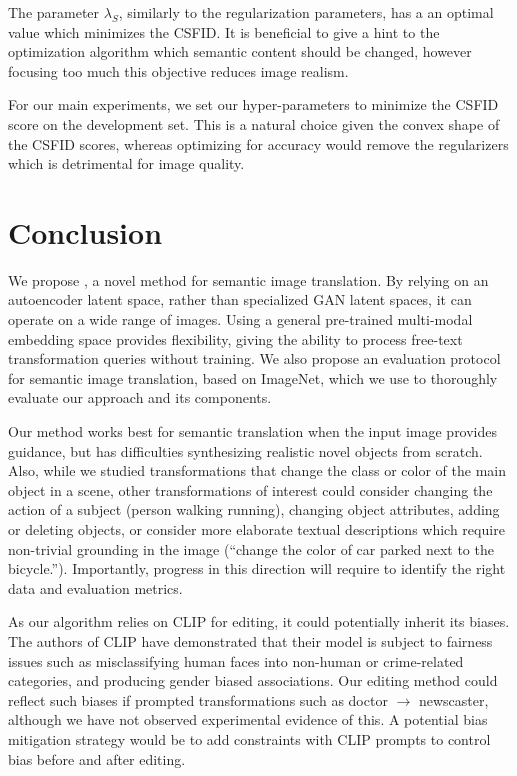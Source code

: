 The parameter $\lambda_S$, similarly to the regularization parameters, has a an optimal
 value which minimizes the CSFID. It is beneficial to give a hint to the optimization 
 algorithm which semantic content should be changed, however focusing too much this 
 objective reduces image realism.

For our main experiments, we set our hyper-parameters to  minimize the CSFID score on 
the development set. This is a natural choice given the convex shape of the CSFID 
scores, whereas optimizing for accuracy  would   remove the regularizers which is 
detrimental for image quality.




\section{Conclusion}

We propose \ours, a novel method for semantic image translation.
By relying on an autoencoder latent space, rather than specialized GAN latent spaces,
it can operate on 
a wide range of images. 
Using a general pre-trained multi-modal embedding space provides  flexibility, giving 
\ours the ability to process free-text transformation queries without training. We  
also propose an evaluation protocol for semantic image translation, based on ImageNet,
 which we use to thoroughly evaluate our approach and its components.

Our method works best for semantic translation when the input image provides guidance,
 but has difficulties synthesizing realistic novel objects from scratch. 
Also, while we studied transformations that change the class or color of the main 
object in a scene, other transformations of interest could consider changing the 
action of a subject (person walking \vs  running), changing object attributes, 
adding or deleting objects, or consider more elaborate textual descriptions which 
require non-trivial grounding in the image (``change the color of car parked next to 
the bicycle.''). Importantly, progress in this direction will require to identify the 
right data and evaluation metrics. 

As our algorithm relies on CLIP for editing, it could potentially inherit its biases. 
The authors of CLIP have demonstrated that their model is subject to fairness issues 
such as misclassifying human faces into non-human or crime-related categories, and 
producing gender biased associations. Our editing method could reflect such biases if 
prompted transformations such as doctor $\rightarrow$ newscaster, although we have not
 observed experimental evidence of this. A potential bias mitigation strategy would be 
 to add constraints with CLIP prompts to control bias before and after editing.

